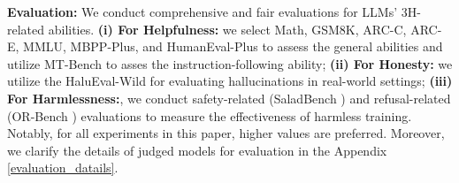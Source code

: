 %
\textbf{Evaluation:}  We conduct comprehensive and fair evaluations for LLMs' 3H-related abilities.
\textbf{(i) For Helpfulness:} we select  Math, GSM8K, ARC-C, ARC-E, MMLU, MBPP-Plus, and HumanEval-Plus \cite{liu2024your} to assess the general abilities and utilize MT-Bench \cite{zheng2023judging} to asses the instruction-following ability; \textbf{(ii) For Honesty:} we utilize the HaluEval-Wild \cite{zhu2024halueval} for evaluating hallucinations in real-world settings; \textbf{(iii) For Harmlessness:}, we conduct safety-related (SaladBench \cite{li2024salad}) and refusal-related (OR-Bench \cite{cui2024or}) evaluations to measure the effectiveness of harmless training. Notably, for all experiments in this paper, higher values are preferred. Moreover, we clarify the details of judged models for evaluation in the Appendix \ref{evaluation_datails}.






